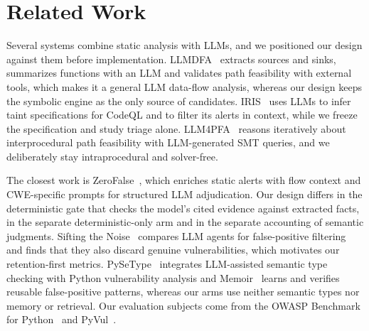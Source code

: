 \section{Related Work}
\label{sec:related}

Several systems combine static analysis with LLMs, and we positioned our design against them before implementation. LLMDFA~\cite{llmdfa} extracts sources and sinks, summarizes functions with an LLM and validates path feasibility with external tools, which makes it a general LLM data-flow analysis, whereas our design keeps the symbolic engine as the only source of candidates. IRIS~\cite{iris} uses LLMs to infer taint specifications for CodeQL and to filter its alerts in context, while we freeze the specification and study triage alone. LLM4PFA~\cite{llm4pfa} reasons iteratively about interprocedural path feasibility with LLM-generated SMT queries, and we deliberately stay intraprocedural and solver-free.

The closest work is ZeroFalse~\cite{zerofalse}, which enriches static alerts with flow context and CWE-specific prompts for structured LLM adjudication. Our design differs in the deterministic gate that checks the model's cited evidence against extracted facts, in the separate deterministic-only arm and in the separate accounting of semantic judgments. Sifting the Noise~\cite{sifting2026} compares LLM agents for false-positive filtering and finds that they also discard genuine vulnerabilities, which motivates our retention-first metrics. PySeType~\cite{pysetype} integrates LLM-assisted semantic type checking with Python vulnerability analysis and Memoir~\cite{memoir} learns and verifies reusable false-positive patterns, whereas our arms use neither semantic types nor memory or retrieval. Our evaluation subjects come from the OWASP Benchmark for Python~\cite{owaspbench} and PyVul~\cite{pyvul}.
